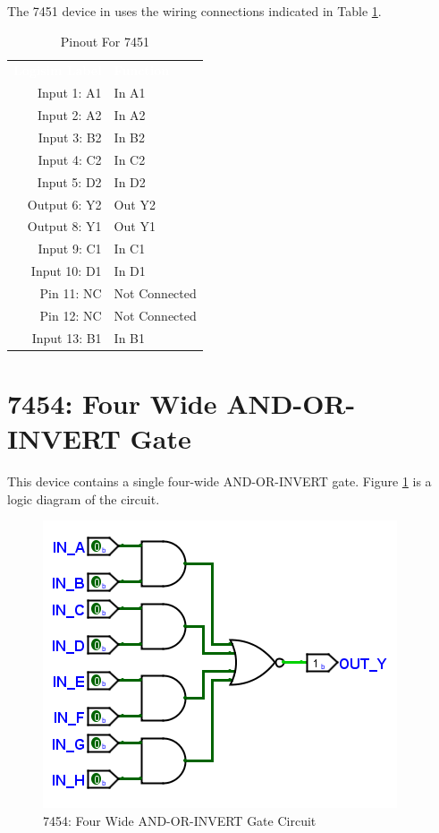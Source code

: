 The 7451 device in \LE uses the wiring connections indicated in Table \ref{tab:50-7451}.

\begin{table}[H]
	\sffamily
	\newcommand{\head}[1]{\textcolor{white}{\textbf{#1}}}		
	\begin{center}
		\begin{tabular}{rl} 
			\rowcolor{black!75}
			\head{Logisim Label} & \head{Function} \\
			Input 1: A1   & In A1         \\
			Input 2: A2   & In A2         \\
			Input 3: B2   & In B2         \\
			Input 4: C2   & In C2         \\
			Input 5: D2   & In D2         \\
			Output 6: Y2  & Out Y2        \\
			Output 8: Y1  & Out Y1        \\
			Input 9: C1   & In C1         \\
			Input 10: D1  & In D1         \\
			Pin 11: NC    & Not Connected \\
			Pin 12: NC    & Not Connected \\
			Input 13: B1  & In B1         \\
		\end{tabular}
	\end{center}
	\caption{Pinout For 7451}
	\label{tab:50-7451}
\end{table}

\section{7454: Four Wide AND-OR-INVERT Gate}

This device contains a single four-wide AND-OR-INVERT gate. Figure \ref{fig:50-7454} is a logic diagram of the circuit.

\begin{figure}[H]
	\centering
	\includegraphics{gfx/50-7454}
	\caption{7454: Four Wide AND-OR-INVERT Gate Circuit}
	\label{fig:50-7454}
\end{figure}

